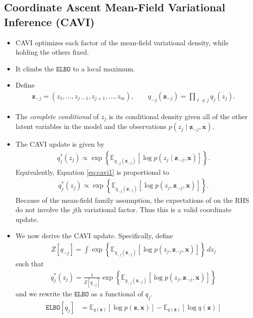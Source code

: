 \documentclass[10pt]{article}
\newcommand{\EE}{\mathbb{E}}
\newcommand{\elbo}{\texttt{ELBO}}
\begin{document}
\subsection{Coordinate Ascent Mean-Field Variational Inference (CAVI)} \label{sec:cavi}

\begin{itemize}
\item CAVI optimizes each factor of the mean-field variational density, while holding the others fixed.
\item It climbs the $\elbo$ to a local maximum.
\item Define
\begin{align*}
\bm{z}_{-j} = (z_1, \ldots, z_{j - 1},z_{j + 1}, \ldots, z_m), \qquad q_{-j}(\bm{z}_{-j}) = \prod_{\ell \neq j} q_j(z_j).
\end{align*}
\item The \textit{complete conditional} of $z_j$ is its conditional density given all of the other latent variables in the model and the observations $p(z_j \mid \bm{z}_{-j}, \bm{x})$.
\item The CAVI update is given by
\begin{align} \label{eq:cavi1}
q^*_j(z_j) \propto \exp\left\{ \EE_{q_{-j}(\bm{z}_{-j})}[ \log p(z_j \mid \bm{z}_{-j}, \bm{x})] \right\}.
\end{align}
Equivalently, Equation \eqref{eq:cavi1} is proportional to
\begin{align} \label{eq:cavi2}
q^*_j(z_j) \propto \exp\left\{ \EE_{q_{-j}(\bm{z}_{-j})}[ \log p(z_j, \bm{z}_{-j}, \bm{x}) ] \right\}.
\end{align}
Because of the mean-field family assumption, the expectations of on the RHS do not involve the $j$th variational factor. Thus this is a valid coordinate update.
\item We now derive the CAVI update. Specifically, define
\begin{align*}
Z[q_{-j}] = \int \exp\left\{ \EE_{q_{-j}(\bm{z}_{-j})}[ \log p(z_j, \bm{z}_{-j}, \bm{x}) ] \right\} \, dz_j
\end{align*}
such that
\begin{align*}
q_j^*(z_j) = \frac{1}{Z[q_{-j}]} \exp\left\{ \EE_{q_{-j}(\bm{z}_{-j})}[ \log p(z_j, \bm{z}_{-j}, \bm{x}) ] \right\}
\end{align*}
and we rewrite the $\elbo$ as a functional of $q_j$.
\begin{align*}
\elbo[q_j] &= \EE_{q(\bm{z})} [ \log p(\bm{z},\bm{x}) ] - \EE_{q(\bm{z})} [\log q(\bm{z})] \\

\end{align*}
\end{itemize}
\end{document}
